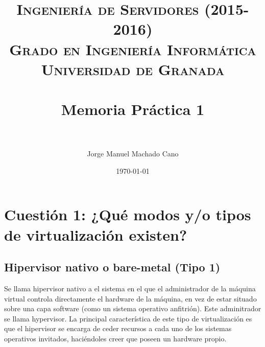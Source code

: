 


\title{	
\normalfont \normalsize 
\textsc{{\bf Ingeniería de Servidores (2015-2016)} \\ Grado en Ingeniería Informática \\ Universidad de Granada} \\ [25pt] %
\horrule{0.5pt} \\[0.4cm] %
\huge Memoria Práctica 1 \\ %
\horrule{2pt} \\[0.5cm] %
}

\author{Jorge Manuel Machado Cano} %

\date{\normalsize\today} %




\maketitle %

\newpage %

\tableofcontents %

\listoffigures

\listoftables

\newpage

\graphicspath{{./imagenes/}}


\section{Cuestión 1: ¿Qué modos y/o tipos de virtualización existen?}

\subsection{Hipervisor nativo o bare-metal (Tipo 1)}
Se llama hipervisor nativo a el sistema en el que el administrador de la máquina virtual controla directamente el hardware de la máquina, en vez de estar situado sobre una capa software (como un sistema operativo anfitrión). Este adminitrador se llama hypervisor. La principal característica de este tipo de virtualización es que el hipervisor se encarga de ceder recursos a cada uno de los sistemas operativos invitados, haciéndoles creer que poseen un hardware propio.\cite{hn}

